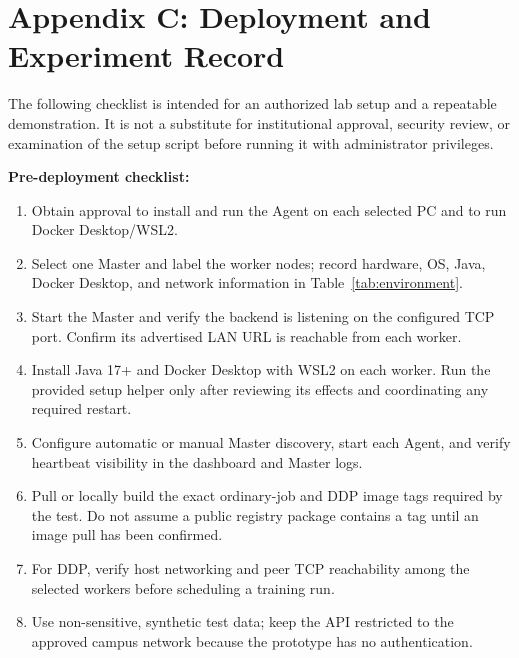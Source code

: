 \documentclass{article}
\begin{document}
\pagebreak
\section{Appendix C: Deployment and Experiment Record}
The following checklist is intended for an authorized lab setup and a repeatable demonstration. It is not a substitute for institutional approval, security review, or examination of the setup script before running it with administrator privileges.

\textbf{Pre-deployment checklist:}
\begin{enumerate}
  \item Obtain approval to install and run the Agent on each selected PC and to run Docker Desktop/WSL2.
  \item Select one Master and label the worker nodes; record hardware, OS, Java, Docker Desktop, and network information in Table~\ref{tab:environment}.
  \item Start the Master and verify the backend is listening on the configured TCP port. Confirm its advertised LAN URL is reachable from each worker.
  \item Install Java 17+ and Docker Desktop with WSL2 on each worker. Run the provided setup helper only after reviewing its effects and coordinating any required restart.
  \item Configure automatic or manual Master discovery, start each Agent, and verify heartbeat visibility in the dashboard and Master logs.
  \item Pull or locally build the exact ordinary-job and DDP image tags required by the test. Do not assume a public registry package contains a tag until an image pull has been confirmed.
  \item For DDP, verify host networking and peer TCP reachability among the selected workers before scheduling a training run.
  \item Use non-sensitive, synthetic test data; keep the API restricted to the approved campus network because the prototype has no authentication.
\end{enumerate}
\end{document}
